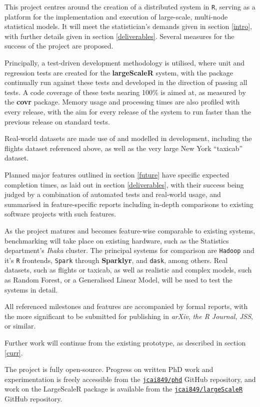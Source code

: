 This project centres around the creation of a distributed system in \texttt{R}, serving as a platform for the implementation and execution of large-scale, multi-node statistical models.
It will meet the statistician's demands given in section \ref{intro}, with further details given in section \ref{deliverables}.
Several measures for the success of the project are proposed.

Principally, a test-driven development methodology is utilised, where unit and regression tests are created for the \textbf{largeScaleR} system, with the package continually run against these tests and developed in the direction of passing all tests.
A code coverage of these tests nearing 100\% is aimed at, as measured by the \textbf{covr} package.
Memory usage and processing times are also profiled with every release, with the aim for every release of the system to run faster than the previous release on standard tests.

Real-world datasets are made use of and modelled in development, including the flights dataset referenced above, as well as the very large New York ``taxicab'' dataset\cite{tlc2021trips}.

Planned major features outlined in section \ref{future} have specific expected completion times, as laid out in section \ref{deliverables}, with their success being judged by a combination of automated tests and real-world usage, and summarised in feature-specific reports including in-depth comparisons to existing software projects with such features.

As the project matures and becomes feature-wise comparable to existing systems, benchmarking will take place on existing hardware, such as the Statistics department's \textit{Ihaka} cluster. 
The principal systems for comparison are \texttt{Hadoop} and it's \texttt{R} frontends, \texttt{Spark} through \textbf{Sparklyr}, and \texttt{dask}, among others.
Real datasets, such as flights or taxicab, as well as realistic and complex models, such as Random Forest, or a Generalised Linear Model, will be used to test the systems in detail.

All referenced milestones and features are accompanied by formal reports, with the more significant to be submitted for publishing in \textit{arXiv}, \textit{the R Journal}, \textit{JSS}, or similar.

Further work will continue from the existing prototype, as described in section \ref{curr}.

The project is fully open-source.
Progress on written PhD work and experimentation is freely accessible from the \href{https://github.com/jcai849/phd}{\texttt{jcai849/phd}} GitHub repository, and work on the LargeScaleR package is available from the \href{https://github.com/jcai849/phd}{\texttt{jcai849/largeScaleR}} GitHub repository\cite{cairns2020largescaler}.
